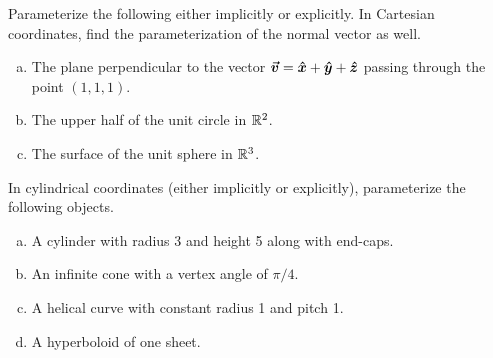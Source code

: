 \documentclass[12pt]{article} %
\begin{document}
\begin{problem} 
Parameterize the following either implicitly or explicitly. In Cartesian coordinates, find the parameterization of the normal vector as well.
\begin{enumerate}[(a)]
	\item The plane perpendicular to the vector $\boldsymbol{\vec{v}} = \boldsymbol{\hat{x}} + \boldsymbol{\hat{y}} + \boldsymbol{\hat{z}}$ passing through the point $(1,1,1)$.
	\item The upper half of the unit circle in $\mathbb{R}^2$.
	\item The surface of the unit sphere in $\mathbb{R}^3$.
\end{enumerate}
\end{problem}

\begin{problem}
	In cylindrical coordinates (either implicitly or explicitly), parameterize the following objects.
	\begin{enumerate}[(a)]
		\item A cylinder with radius 3 and height 5 along with end-caps.
		\item An infinite cone with a vertex angle of $\pi/4$.
		\item A helical curve with constant radius 1 and pitch 1.
		\item A hyperboloid of one sheet.
	\end{enumerate}
\end{problem}
\end{document}
